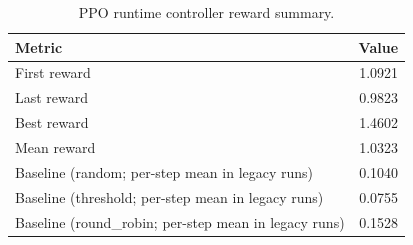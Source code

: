\begin{table}[t]
\centering
\caption{PPO runtime controller reward summary.}
\label{tab:ppo-summary}
\begin{tabular}{lr}
\toprule
Metric & Value \\
\midrule
First reward & 1.0921 \\
Last reward & 0.9823 \\
Best reward & 1.4602 \\
Mean reward & 1.0323 \\
Baseline (random; per-step mean in legacy runs) & 0.1040 \\
Baseline (threshold; per-step mean in legacy runs) & 0.0755 \\
Baseline (round_robin; per-step mean in legacy runs) & 0.1528 \\
\bottomrule
\end{tabular}
\end{table}
